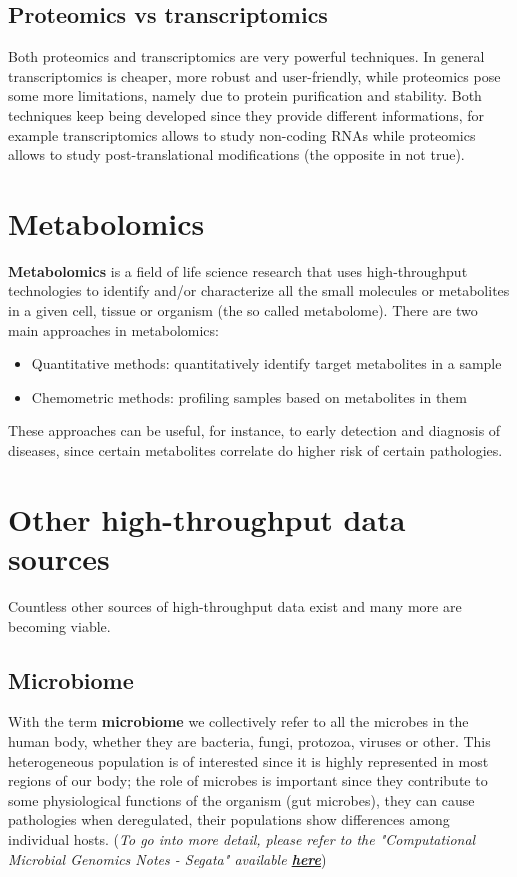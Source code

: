     \subsection{Proteomics vs transcriptomics}
      Both proteomics and transcriptomics are very powerful techniques. In general transcriptomics is cheaper, more robust and user-friendly, while proteomics pose some more limitations, namely due to protein purification and stability. Both techniques keep being developed since they provide different informations, for example transcriptomics allows to study non-coding RNAs while proteomics allows to study post-translational modifications (the opposite in not true).

  \section{Metabolomics} 

    \textbf{Metabolomics} is a field of life science research that uses high-throughput technologies to identify and/or characterize all the small molecules or metabolites in a given cell, tissue or organism (the so called metabolome). There are two main approaches in metabolomics:
    \begin{itemize}
      \item Quantitative methods: quantitatively identify target metabolites in a sample
      \item Chemometric methods: profiling samples based on metabolites in them
    \end{itemize}
    These approaches can be useful, for instance, to early detection and diagnosis of diseases, since certain metabolites correlate do higher risk of certain pathologies.
  
  \section{Other high-throughput data sources}
    Countless other sources of high-throughput data exist and many more are becoming viable. 

    \subsection{Microbiome}
      With the term \textbf{microbiome} we collectively refer to all the microbes in the human body, whether they are bacteria, fungi, protozoa, viruses or other. This heterogeneous population is of interested since it is highly represented in most regions of our body; the role of microbes is important since they contribute to some physiological functions of the organism (gut microbes), they can cause pathologies when deregulated, their populations show differences among individual hosts.
      (\textit{To go into more detail, please refer to the "Computational Microbial Genomics Notes - Segata" available \href{https://github.com/giacThePhantom/computational-microbial-genomics}{\textbf{here}}})

